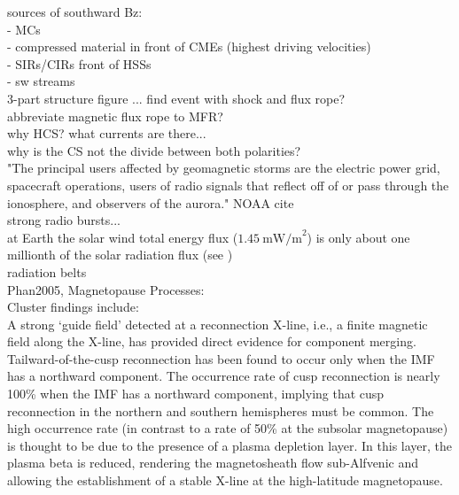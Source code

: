

sources of southward Bz:\\
- MCs\\
- compressed material in front of CMEs (highest driving velocities)\\
- SIRs/CIRs front of HSSs\\
- sw streams\\


3-part structure figure ... find event with shock and flux rope?\\
abbreviate magnetic flux rope to MFR?\\
 
why HCS? what currents are there...\\
why is the CS not the divide between both polarities?\\

"The principal users affected by geomagnetic storms are the electric power grid, spacecraft operations, users of radio signals that reflect off of or pass through the ionosphere, and observers of the aurora." NOAA cite\\

strong radio bursts...\\

at Earth the solar wind total energy flux ($1.45~\text{mW/m}^2$) is only about one millionth of the solar radiation flux (see \citet[p.~153]{Schwenn1990})\\

radiation belts\\

Phan2005, Magnetopause Processes:\\
Cluster findings include:\\
A strong ‘guide field’ detected at a reconnection X-line, i.e., a finite magnetic field along the X-line, has provided direct evidence for component merging.\\
Tailward-of-the-cusp reconnection has been found to occur only when the IMF has a northward component. The occurrence rate of cusp reconnection is nearly 100\% when the IMF has a northward component, implying that cusp reconnection in the northern and southern hemispheres must be common. The high occurrence rate (in contrast to a rate of 50\% at the subsolar magnetopause) is thought to be due to the presence of a plasma depletion layer. In this layer, the plasma beta is reduced, rendering the magnetosheath flow sub-Alfvenic and allowing the establishment of a stable X-line at the high-latitude magnetopause.\\

